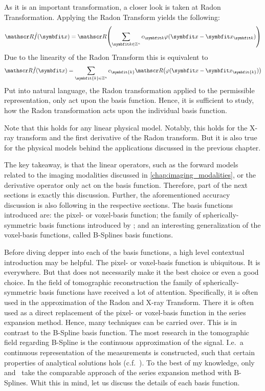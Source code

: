 As it is an important transformation, a closer look is taken at Radon Transformation. Applying the
Radon Transform yields the following:
\[ \radon\near{f}(\mvec{x}) = \radon\left( \sum_{\mvec{k} \in \mathbb{Z}^n} c_{\mvec{k}} \varphi(\mvec{x} - \mvec{x}_{\mvec{k}}) \right) \]
Due to the linearity of the Radon Transform this is equivalent to
\[ \radon\hat{f}(\mvec{x}) = \sum_{\symbfit{k} \in \mathbb{Z}^n} c_{\symbfit{k}}\radon\left( \varphi(\mvec{x} - \mvec{x}_{\symbfit{k}}) \right) \]
Put into natural language, the Radon transformation applied to the permissible representation, only
act upon the basis function. Hence, it is sufficient to study, how the Radon transformation acts
upon the individual basis function.

Note that this holds for any linear physical model. Notably, this holds for the X-ray transform and
the first derivative of the Radon transform. But it is also true for the physical models behind the
applications discussed in the previous chapter.

The key takeaway, is that the linear operators, such as the forward models related to the imaging
modalities discussed in \autoref{chap:imaging_modalities}, or the derivative operator only act on
the basis function. Therefore, part of the next sections is exactly this discussion. Further, the
aforementioned accuracy discussion is also following in the respective sections. The basis functions
introduced are: the pixel- or voxel-basis function; the family of spherically-symmetric basis
functions introduced by \citeauthor*{lewitt_multidimensional_1990}; and an interesting
generalization of the voxel-basis functions, called B-Splines basis functions.

Before diving depper into each of the basis functions, a high level contextual introduction may
be helpful. The pixel- or voxel-basis function is ubiquitous. It is everywhere. But that does not
necessarily make it the best choice or even a good choice. In the field of tomographic
reconstruction the family of spherically-symmetric basis functions have received a lot of attention.
Specifically, it is often used in the approximation of the Radon and X-ray Transform. There it is
often used as a direct replacement of the pixel- or voxel-basis function in the series expansion
method. Hence, many techniques can be carried over. This is in contrast to the B-Spline basis
function. The most research in the tomographic field regarding B-Spline is the continuous
approximation of the signal. I.e.\ a continuous representation of the measurements is constructed,
such that certain properties of analytical solutions hols (c.f.~\cite{horbelt_discretization_2002}).
To the best of my knowledge, only~\cite{nilchian_fast_2013}
and~\cite{momey_new_2011,momey_b-spline_2012,momey_spline_2015} take the comparable approach of the
series expansion method with B-Splines. Whit this in mind, let us discuss the details of each basis
function.

